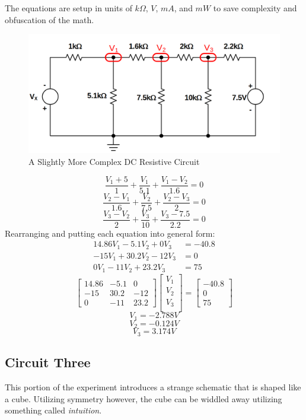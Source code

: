 \documentclass[12pt]{article}
\begin{document}
The equations are setup in units of $k\Omega$, $V$, $mA$, and $mW$ to save
complexity and obfuscation of the math.
\begin{figure}[H]
	\centering
	\includegraphics[width=1\textwidth]{06_02}
	\caption{A Slightly More Complex DC Resistive Circuit}
	\label{fig:circuit2}
\end{figure}
\[
	\frac{V_1 + 5}{1} + \frac{V_1}{5.1} + \frac{V_1 - V_2}{1.6} = 0
\]
\[
	\frac{V_2 - V_1}{1.6} + \frac{V_2}{7.5} + \frac{V_2 - V_3}{2} = 0
\]
\[
	\frac{V_3 - V_2}{2} + \frac{V_3}{10} + \frac{V_3 - 7.5}{2.2} = 0
\]
Rearranging and putting each equation into general form:
\begin{align*}
	14.86V_1 - 5.1V_2 + 0V_3 & = -40.8 \\
	-15V_1 + 30.2V_2 - 12V_3 & = 0     \\
	0V_1 - 11V_2 +23.2V_3    & = 75
\end{align*}
\[
	\begin{bmatrix}
		14.86 & -5.1 & 0     \\
		-15   & 30.2 & -12   \\
		0     & -11  & 23.2
	\end{bmatrix}
	\begin{bmatrix}
		V_1 \\
		V_2 \\
		V_3 \\
	\end{bmatrix}
	=
	\begin{bmatrix}
		-40.8 \\
		0     \\
		75
	\end{bmatrix}
\]
\[
	V_1 = -2.788V
\]
\[
	V_2 = -0.124V
\]
\[
	V_3 = 3.174V
\]
\subsection{Circuit Three}

This portion of the experiment introduces a strange schematic that is shaped
like a cube. Utilizing symmetry however, the cube can be widdled away utilizing
something called \textit{intuition}.
\end{document}
